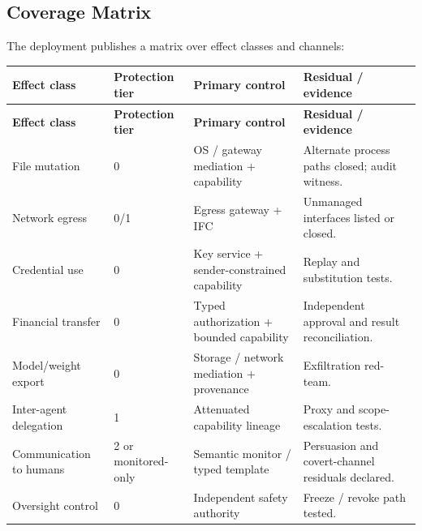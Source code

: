 \documentclass[11pt]{article}
\begin{document}
\subsection{Coverage Matrix}\label{sec:gc}
The deployment publishes a matrix over effect classes and channels:
\begin{longtable}{@{}L{3.6cm} L{3.0cm} L{3.2cm} L{4.2cm}@{}}
\toprule
\textbf{Effect class} & \textbf{Protection tier} & \textbf{Primary control} & \textbf{Residual / evidence}\\
\midrule
\endfirsthead
\toprule
\textbf{Effect class} & \textbf{Protection tier} & \textbf{Primary control} & \textbf{Residual / evidence}\\
\midrule
\endhead
\bottomrule
\endfoot
File mutation & 0 & OS / gateway mediation + capability & Alternate process paths closed; audit witness. \\
Network egress & 0/1 & Egress gateway + IFC & Unmanaged interfaces listed or closed. \\
Credential use & 0 & Key service + sender-constrained capability & Replay and substitution tests. \\
Financial transfer & 0 & Typed authorization + bounded capability & Independent approval and result reconciliation. \\
Model/weight export & 0 & Storage / network mediation + provenance & Exfiltration red-team. \\
Inter-agent delegation & 1 & Attenuated capability lineage & Proxy and scope-escalation tests. \\
Communication to humans & 2 or monitored-only & Semantic monitor / typed template & Persuasion and covert-channel residuals declared. \\
Oversight control & 0 & Independent safety authority & Freeze / revoke path tested. \\
\end{longtable}
\end{document}
